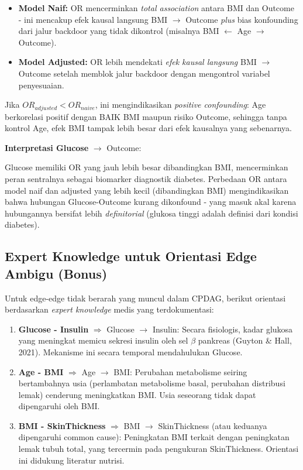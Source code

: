 \documentclass[
  11pt,
]{article}
\providecommand{\tightlist}{%
  \setlength{\itemsep}{0pt}\setlength{\parskip}{0pt}}
\begin{document}
\begin{itemize}
\tightlist
\item
  \textbf{Model Naif:} OR mencerminkan \emph{total association} antara
  BMI dan Outcome - ini mencakup efek kausal langsung BMI \(\to\)
  Outcome \emph{plus} bias konfounding dari jalur backdoor yang tidak
  dikontrol (misalnya BMI \(\leftarrow\) Age \(\to\) Outcome).
\item
  \textbf{Model Adjusted:} OR lebih mendekati \emph{efek kausal
  langsung} BMI \(\to\) Outcome setelah memblok jalur backdoor dengan
  mengontrol variabel penyesuaian.
\end{itemize}

Jika \(OR_{adjusted} < OR_{naive}\), ini mengindikasikan \emph{positive
confounding}: Age berkorelasi positif dengan BAIK BMI maupun risiko
Outcome, sehingga tanpa kontrol Age, efek BMI tampak lebih besar dari
efek kausalnya yang sebenarnya.

\textbf{Interpretasi Glucose} \(\to\) Outcome:

Glucose memiliki OR yang jauh lebih besar dibandingkan BMI, mencerminkan
peran sentralnya sebagai biomarker diagnostik diabetes. Perbedaan OR
antara model naif dan adjusted yang lebih kecil (dibandingkan BMI)
mengindikasikan bahwa hubungan Glucose-Outcome kurang dikonfound - yang
masuk akal karena hubungannya bersifat lebih \emph{definitorial}
(glukosa tinggi adalah definisi dari kondisi diabetes).

\subsection{Expert Knowledge untuk Orientasi Edge Ambigu
(Bonus)}\label{expert-knowledge-untuk-orientasi-edge-ambigu-bonus}

Untuk edge-edge tidak berarah yang muncul dalam CPDAG, berikut orientasi
berdasarkan \emph{expert knowledge} medis yang terdokumentasi:

\begin{enumerate}
\def\labelenumi{\arabic{enumi}.}
\item
  \textbf{Glucose - Insulin} \(\Rightarrow\) Glucose \(\to\) Insulin:
  Secara fisiologis, kadar glukosa yang meningkat memicu sekresi insulin
  oleh sel \(\beta\) pankreas (Guyton \& Hall, 2021). Mekanisme ini
  secara temporal mendahulukan Glucose.
\item
  \textbf{Age - BMI} \(\Rightarrow\) Age \(\to\) BMI: Perubahan
  metabolisme seiring bertambahnya usia (perlambatan metabolisme basal,
  perubahan distribusi lemak) cenderung meningkatkan BMI. Usia seseorang
  tidak dapat dipengaruhi oleh BMI.
\item
  \textbf{BMI - SkinThickness} \(\Rightarrow\) BMI \(\to\) SkinThickness
  (atau keduanya dipengaruhi common cause): Peningkatan BMI terkait
  dengan peningkatan lemak tubuh total, yang tercermin pada pengukuran
  SkinThickness. Orientasi ini didukung literatur nutrisi.
\end{enumerate}
\end{document}
